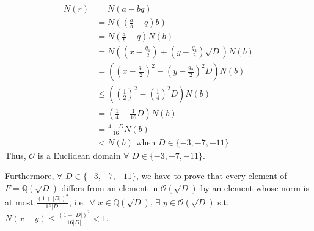 \documentclass[fleqn]{article}
\begin{document}
        \begin{align}
            N(r) &= N(a - bq) \\
                &= N\left(\left(\frac{a}{b} - q\right) b\right) \\
                &= N\left(\frac{a}{b} - q\right) N(b) \\
                &= N\left(\left(x - \frac{q_1}{2}\right) + \left(y - \frac{q_2}{2}\right) \sqrt{D}\right) N(b) \\
                &= \left(\left(x - \frac{q_1}{2}\right)^2 - \left(y - \frac{q_2}{2}\right)^2 D\right) N(b) \\
                &\leq \left(\left(\frac{1}{2}\right)^2 - \left(\frac{1}{4}\right)^2 D\right) N(b) \\
                &= \left(\frac{1}{4} - \frac{1}{16} D\right) N(b) \\
                &= \frac{4 - D}{16} N(b) \\
                &< N(b) \text{ when } D \in \{-3, -7, -11\}
        \end{align}
        Thus, $\mathcal{O}$ is a Euclidean domain $\forall$ $D \in \{-3, -7, -11\}$.
        
        Furthermore, $\forall$ $D \in \{-3, -7, -11\}$, we have to prove that every element of $F = \mathbb{Q}\left(\sqrt{D}\right)$ differs from an element in $\mathcal{O}\left(\sqrt{D}\right)$ by an element whose norm is at most $\frac{(1 + |D|)^2}{16 |D|}$, i.e.\ $\forall$ $x \in \mathbb{Q}\left(\sqrt{D}\right)$, $\exists$ $y \in \mathcal{O}\left(\sqrt{D}\right)$ s.t.\ $N(x - y) \leq \frac{(1 + |D|)^2}{16 |D|} < 1$.
        
\end{document}
